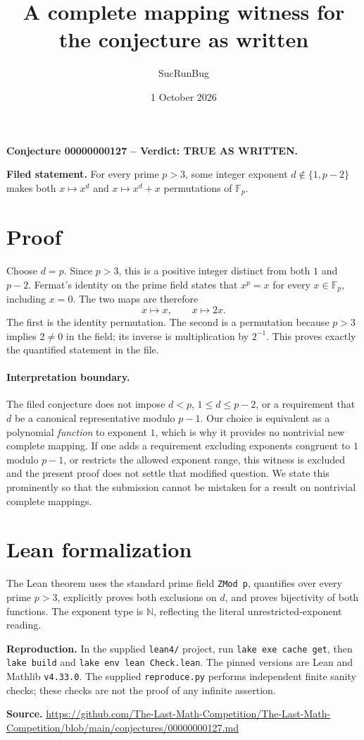 \documentclass[11pt]{article}
\title{A complete mapping witness for the conjecture as written}
\author{SucRunBug}
\date{1 October 2026}
\begin{document}
\maketitle
\textbf{Conjecture 00000000127 -- Verdict: TRUE AS WRITTEN.}

\textbf{Filed statement.} For every prime $p>3$, some integer exponent $d\notin\{1,p-2\}$ makes both $x\mapsto x^d$ and $x\mapsto x^d+x$ permutations of $\mathbb F_p$.

\section*{Proof}
Choose $d=p$. Since $p>3$, this is a positive integer distinct from both $1$ and $p-2$. Fermat's identity on the prime field states that $x^p=x$ for every $x\in\mathbb F_p$, including $x=0$. The two maps are therefore
\[x\longmapsto x,\qquad x\longmapsto 2x.\]
The first is the identity permutation. The second is a permutation because $p>3$ implies $2\ne0$ in the field; its inverse is multiplication by $2^{-1}$. This proves exactly the quantified statement in the file.

\paragraph{Interpretation boundary.} The filed conjecture does not impose $d<p$, $1\le d\le p-2$, or a requirement that $d$ be a canonical representative modulo $p-1$. Our choice is equivalent as a polynomial \emph{function} to exponent $1$, which is why it provides no nontrivial new complete mapping. If one adds a requirement excluding exponents congruent to $1$ modulo $p-1$, or restricts the allowed exponent range, this witness is excluded and the present proof does not settle that modified question. We state this prominently so that the submission cannot be mistaken for a result on nontrivial complete mappings.

\section*{Lean formalization}
The Lean theorem uses the standard prime field \texttt{ZMod p}, quantifies over every prime $p>3$, explicitly proves both exclusions on $d$, and proves bijectivity of both functions. The exponent type is $\mathbb N$, reflecting the literal unrestricted-exponent reading.

\textbf{Reproduction.} In the supplied \texttt{lean4/} project, run
\texttt{lake exe cache get}, then \texttt{lake build} and
\texttt{lake env lean Check.lean}. The pinned versions are Lean and Mathlib
\texttt{v4.33.0}. The supplied \texttt{reproduce.py} performs independent
finite sanity checks; these checks are not the proof of any infinite assertion.

\textbf{Source.} \url{https://github.com/The-Last-Math-Competition/The-Last-Math-Competition/blob/main/conjectures/00000000127.md}
\end{document}
